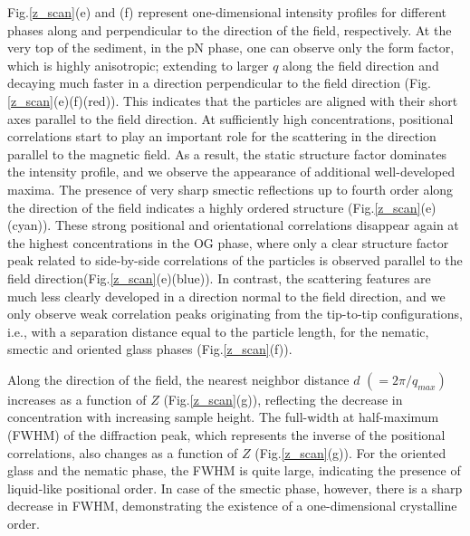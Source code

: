 \documentclass[aps,prl,preprint,superscriptaddress]{revtex4-1}
\begin{document}
Fig.\ref{z_scan}(e) and (f) represent one-dimensional intensity profiles for different phases along and perpendicular to the direction of the field, respectively. At the very top of the sediment, in the pN phase, one can observe only the form factor, which is highly anisotropic; extending to larger $q$ along the field direction and decaying much faster in a direction perpendicular to the field direction (Fig.\ref{z_scan}(e)(f)(red)). This indicates that the particles are aligned with their short axes parallel to the field direction. At sufficiently high concentrations, positional correlations start to play an important role for the scattering in the direction parallel to the magnetic field. As a result, the static structure factor dominates the intensity profile, and we observe the appearance of additional well-developed maxima. The presence of very sharp smectic reflections up to fourth order along the direction of the field indicates a highly ordered structure (Fig.\ref{z_scan}(e)(cyan)). These strong positional and orientational correlations disappear again at the highest concentrations in the OG phase, where only a clear structure factor peak related to side-by-side correlations of the particles is observed parallel to the field direction(Fig.\ref{z_scan}(e)(blue)). In contrast, the scattering features are much less clearly developed in a direction normal to the field direction, and we only observe weak correlation peaks originating from the tip-to-tip configurations, i.e., with a separation distance equal to the particle length, for the nematic, smectic and oriented glass phases (Fig.\ref{z_scan}(f)). \par
Along the direction of the field, the nearest neighbor distance $d$ $(=2\pi/q_{max})$ increases as a function of $Z$ (Fig.\ref{z_scan}(g)), reflecting the decrease in concentration with increasing sample height. The full-width at half-maximum (FWHM) of the diffraction peak, which represents the inverse of the positional correlations, also changes as a function of $Z$ (Fig.\ref{z_scan}(g)). For the oriented glass and the nematic phase, the FWHM is quite large, indicating the presence of liquid-like positional order. In case of the smectic phase, however, there is a sharp decrease in FWHM, demonstrating the existence of a one-dimensional crystalline order.\par   
\end{document}
